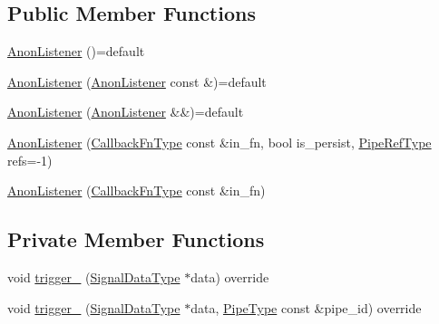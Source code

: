 \subsection*{Public Member Functions}
\begin{DoxyCompactItemize}
\item 
\hyperlink{structvt_1_1pipe_1_1callback_1_1_anon_listener_ad9ac07733e0f6500aa340c606370eef7}{Anon\+Listener} ()=default
\item 
\hyperlink{structvt_1_1pipe_1_1callback_1_1_anon_listener_aa118ce8196dc5ae4bcce9c076c13fe96}{Anon\+Listener} (\hyperlink{structvt_1_1pipe_1_1callback_1_1_anon_listener}{Anon\+Listener} const \&)=default
\item 
\hyperlink{structvt_1_1pipe_1_1callback_1_1_anon_listener_aa6d501a31dc807d01a6b71bc2011e90d}{Anon\+Listener} (\hyperlink{structvt_1_1pipe_1_1callback_1_1_anon_listener}{Anon\+Listener} \&\&)=default
\item 
\hyperlink{structvt_1_1pipe_1_1callback_1_1_anon_listener_aa0b98d4f63eb9b2dbdb30ee37a867497}{Anon\+Listener} (\hyperlink{structvt_1_1pipe_1_1callback_1_1_anon_listener_ad5d8a2cc6a1599642855e92bbd10f89c}{Callback\+Fn\+Type} const \&in\+\_\+fn, bool is\+\_\+persist, \hyperlink{namespacevt_ace18d74dd489d9ea506d38789fffce34}{Pipe\+Ref\+Type} refs=-\/1)
\item 
\hyperlink{structvt_1_1pipe_1_1callback_1_1_anon_listener_ad7eef759667c0dcff5506ab45e28eda4}{Anon\+Listener} (\hyperlink{structvt_1_1pipe_1_1callback_1_1_anon_listener_ad5d8a2cc6a1599642855e92bbd10f89c}{Callback\+Fn\+Type} const \&in\+\_\+fn)
\end{DoxyCompactItemize}
\subsection*{Private Member Functions}
\begin{DoxyCompactItemize}
\item 
void \hyperlink{structvt_1_1pipe_1_1callback_1_1_anon_listener_ae96641b0c7f934d693018d91cfa7add4}{trigger\+\_\+} (\hyperlink{structvt_1_1pipe_1_1callback_1_1_anon_listener_a26182294e0b15bb16dd94040bb47ed73}{Signal\+Data\+Type} $\ast$data) override
\item 
void \hyperlink{structvt_1_1pipe_1_1callback_1_1_anon_listener_a8694018348ea69945fbc090bced5d4aa}{trigger\+\_\+} (\hyperlink{structvt_1_1pipe_1_1callback_1_1_anon_listener_a26182294e0b15bb16dd94040bb47ed73}{Signal\+Data\+Type} $\ast$data, \hyperlink{namespacevt_ac9852acda74d1896f48f406cd72c7bd3}{Pipe\+Type} const \&pipe\+\_\+id) override
\end{DoxyCompactItemize}
